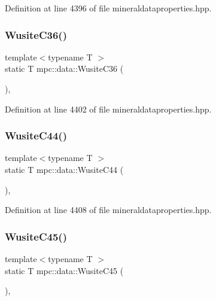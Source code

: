 Definition at line 4396 of file mineraldataproperties.\+hpp.

\mbox{\label{namespacempc_1_1data_a2e67d60c4ab401d66638b62b681fd1bc}} 
\subsubsection{\texorpdfstring{Wusite\+C36()}{WusiteC36()}}
{\footnotesize\ttfamily template$<$typename T $>$ \\
static T mpc\+::data\+::\+Wusite\+C36 (\begin{DoxyParamCaption}{ }\end{DoxyParamCaption})\hspace{0.3cm}{\ttfamily [inline]}, {\ttfamily [static]}}



Definition at line 4402 of file mineraldataproperties.\+hpp.

\mbox{\label{namespacempc_1_1data_ab6bc5ae1ba48e452df944f27426d5100}} 
\subsubsection{\texorpdfstring{Wusite\+C44()}{WusiteC44()}}
{\footnotesize\ttfamily template$<$typename T $>$ \\
static T mpc\+::data\+::\+Wusite\+C44 (\begin{DoxyParamCaption}{ }\end{DoxyParamCaption})\hspace{0.3cm}{\ttfamily [inline]}, {\ttfamily [static]}}



Definition at line 4408 of file mineraldataproperties.\+hpp.

\mbox{\label{namespacempc_1_1data_a93d0f44c91d26a05c02787ecc5a664f8}} 
\subsubsection{\texorpdfstring{Wusite\+C45()}{WusiteC45()}}
{\footnotesize\ttfamily template$<$typename T $>$ \\
static T mpc\+::data\+::\+Wusite\+C45 (\begin{DoxyParamCaption}{ }\end{DoxyParamCaption})\hspace{0.3cm}{\ttfamily [inline]}, {\ttfamily [static]}}



